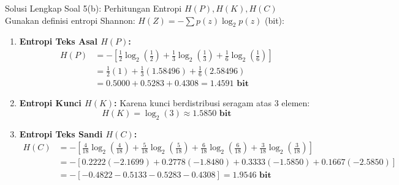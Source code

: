 \documentclass[11pt,a4paper]{article}
\begin{document}
\begin{solusibox}{Solusi Lengkap Soal 5(b): Perhitungan Entropi $H(P), H(K), H(C)$}
Gunakan definisi entropi Shannon: $H(Z) = -\sum p(z) \log_2 p(z)$ (bit):
\begin{enumerate}[leftmargin=*]
    \item \textbf{Entropi Teks Asal $H(P)$:}
    \begin{align*}
    H(P) &= -\left[\frac{1}{2}\log_2\left(\frac{1}{2}\right) + \frac{1}{3}\log_2\left(\frac{1}{3}\right) + \frac{1}{6}\log_2\left(\frac{1}{6}\right)\right] \\
    &= \frac{1}{2}(1) + \frac{1}{3}(1.58496) + \frac{1}{6}(2.58496) \\
    &= 0.5000 + 0.5283 + 0.4308 = \mathbf{1.4591 \text{ bit}}
    \end{align*}
    \item \textbf{Entropi Kunci $H(K)$:}
    Karena kunci berdistribusi seragam atas 3 elemen:
    \[
    H(K) = \log_2(3) \approx \mathbf{1.5850 \text{ bit}}
    \]
    \item \textbf{Entropi Teks Sandi $H(C)$:}
    \begin{align*}
    H(C) &= -\left[\frac{4}{18}\log_2\left(\frac{4}{18}\right) + \frac{5}{18}\log_2\left(\frac{5}{18}\right) + \frac{6}{18}\log_2\left(\frac{6}{18}\right) + \frac{3}{18}\log_2\left(\frac{3}{18}\right)\right] \\
    &= -\left[0.2222(-2.1699) + 0.2778(-1.8480) + 0.3333(-1.5850) + 0.1667(-2.5850)\right] \\
    &= -[-0.4822 - 0.5133 - 0.5283 - 0.4308] = \mathbf{1.9546 \text{ bit}}
    \end{align*}
\end{enumerate}
\end{solusibox}

\vspace{0.3cm}
\end{document}
